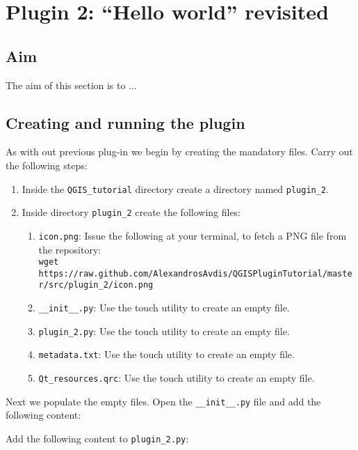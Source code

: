\section{Plugin 2: ``Hello world'' revisited}
\label{sect:plugin_2}
\subsection{Aim}
\label{ssect:plugin_2_aim}
\par %
The aim of this section is to ...
\subsection{Creating and running the plugin}
\label{ssect:creating_plugin_1}
\par %
As with out previous plug-in we begin by creating the mandatory files. Carry out the following steps:
\begin{enumerate}
  \item Inside the \lstinline{QGIS_tutorial} directory create a directory named \lstinline{plugin_2}.
  \item Inside directory \lstinline{plugin_2} create the following files:
  \begin{enumerate}
    \item \lstinline{icon.png}: Issue the following at your terminal, to fetch a PNG file from the repository:\\ \scriptsize\verb+wget https://raw.github.com/AlexandrosAvdis/QGISPluginTutorial/master/src/plugin_2/icon.png+ \normalsize
    \item \lstinline{__init__.py}: Use the touch utility to create an empty file.
    \item \lstinline{plugin_2.py}: Use the touch utility to create an empty file.
    \item \lstinline{metadata.txt}: Use the touch utility to create an empty file.
    \item \lstinline{Qt_resources.qrc}: Use the touch utility to create an empty file.
  \end{enumerate}
\end{enumerate}
Next we populate the empty files. Open the \lstinline{__init__.py} file and add the following content:

\par%
Add the following content to \lstinline{plugin_2.py}:


